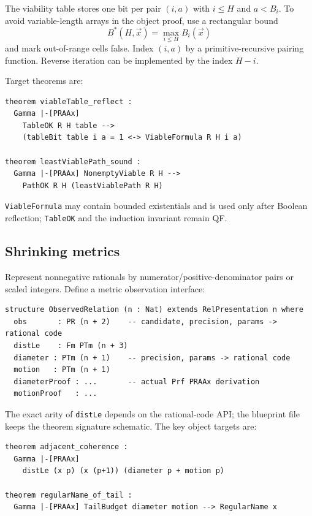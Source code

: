 The viability table stores one bit per pair \((i,a)\) with \(i\le H\) and \(a<B_i\).  To avoid variable-length arrays in the object proof, use a rectangular bound
\[
 B^*(H,\vec{x})=\max_{i\le H}B_i(\vec{x})
\]
and mark out-of-range cells false.  Index \((i,a)\) by a primitive-recursive pairing function.  Reverse iteration can be implemented by the index \(H-i\).

Target theorems are:

\begin{lstlisting}[language={}]
theorem viableTable_reflect :
  Gamma |-[PRAAx]
    TableOK R H table -->
    (tableBit table i a = 1 <-> ViableFormula R H i a)

theorem leastViablePath_sound :
  Gamma |-[PRAAx] NonemptyViable R H -->
    PathOK R H (leastViablePath R H)
\end{lstlisting}

\texttt{ViableFormula} may contain bounded existentials and is used only after Boolean reflection; \texttt{TableOK} and the induction invariant remain QF.

\subsection{Shrinking metrics}

Represent nonnegative rationals by numerator/positive-denominator pairs or scaled integers.  Define a metric observation interface:

\begin{lstlisting}[language={}]
structure ObservedRelation (n : Nat) extends RelPresentation n where
  obs       : PR (n + 2)    -- candidate, precision, params -> rational code
  distLe    : Fm PTm (n + 3)
  diameter : PTm (n + 1)    -- precision, params -> rational code
  motion   : PTm (n + 1)
  diameterProof : ...       -- actual Prf PRAAx derivation
  motionProof   : ...
\end{lstlisting}

The exact arity of \texttt{distLe} depends on the rational-code API; the blueprint file keeps the theorem signature schematic.  The key object targets are:

\begin{lstlisting}[language={}]
theorem adjacent_coherence :
  Gamma |-[PRAAx]
    distLe (x p) (x (p+1)) (diameter p + motion p)

theorem regularName_of_tail :
  Gamma |-[PRAAx] TailBudget diameter motion --> RegularName x
\end{lstlisting}

